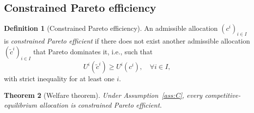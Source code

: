 \documentclass[11pt,a4paper,oneside]{book}
\def\geq{\geqslant}
\theoremstyle{plain}
\newtheorem{theorem}{Theorem}[chapter]
\theoremstyle{definition}
\newtheorem{definition}[theorem]{Definition}
\theoremstyle{remark}
\numberwithin{equation}{chapter}
\begin{document}
\subsection{Constrained Pareto efficiency}

\begin{definition}[Constrained Pareto efficiency]\label{def:constrained-pareto}
An admissible allocation $(c^i)_{i \in I}$ is \emph{constrained Pareto efficient} if there does not exist another admissible allocation $(\widetilde{c}^i)_{i \in I}$ that Pareto dominates it, i.e., such that
\begin{equation*}
  U^i(\widetilde{c}^i) \geq U^i(c^i), \quad \forall i \in I,
\end{equation*}
with strict inequality for at least one $i$.
\end{definition}

\begin{theorem}[Welfare theorem]\label{thm:welfare-BGR}
Under Assumption~\ref{ass:C}, every competitive-equilibrium allocation is constrained Pareto efficient.
\end{theorem}
\end{document}
